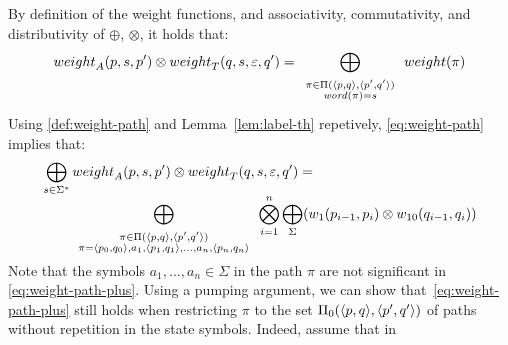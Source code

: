 By definition of the weight functions, and 
associativity, commutativity, and distributivity of $\oplus$, $\otimes$,  
it holds that:
\begin{equation}\label{eq:weight-path}
\weight_A(p, s, p') \otimes \weight_T(q, s, \varepsilon, q') = 
\bigoplus_{\begin{array}{c}
		   \scriptstyle\pi \in \Pi(\< p, q>, \< p', q'>)\\[-1ex]
		   \scriptstyle\word(\pi) = s
		   \end{array}} 
\weight(\pi) 
\end{equation}
%
Using \eqref{def:weight-path} 
and Lemma~\ref{lem:label-th} repetively, 
\eqref{eq:weight-path} implies that:
%
\begin{equation}\label{eq:weight-path-plus}
\begin{array}{l}
\displaystyle\bigoplus_{s \in \Sigma^*} 
  \weight_A(p, s, p') \otimes \weight_T(q, s, \varepsilon, q') =\\
\multicolumn{1}{r}{%
\qquad
\displaystyle\bigoplus_{\begin{array}{c}
		   \scriptstyle\pi \in \Pi(\< p, q>, \< p', q'>)\\[-1ex]
		   \scriptstyle\pi = \< p_0, q_0>, a_1,\< p_1, q_1>,\ldots, a_n, \< p_n, q_n>\\[-1ex]
		   \end{array}} 
\displaystyle\bigotimes_{i = 1}^{n} 
\displaystyle\bigoplus_\Sigma (\wei_1(p_{i-1}, p_i) \otimes
                  \wei_{10}(q_{i-1}, q_i))
}
\end{array}           %
\end{equation}
%
Note that the symbols $a_1, \ldots, a_n \in \Sigma$ in the path $\pi$
are not significant in \eqref{eq:weight-path-plus}.
%
Using a pumping argument, we can show that~\eqref{eq:weight-path-plus}
still holds when restricting $\pi$ to the set $\Pi_0(\< p, q>, \< p', q'>)$
of paths without repetition in the state symbols.
%
Indeed, assume that in 
